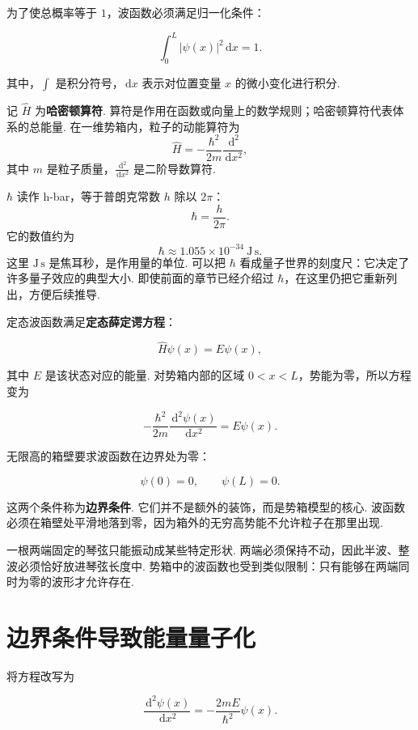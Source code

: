\documentclass[UTF8,11pt,a4paper,openany]{ctexbook}
\newcommand{\dd}{\,\mathrm d}\newcommand{\Ham}{\hat H}\newcommand{\tr}{\operatorname{Tr}}
\newcommand{\term}[1]{\textbf{#1}}
\begin{document}
为了使总概率等于 $1$，波函数必须满足归一化条件：

\[
\int_0^L |\psi(x)|^2\dd x=1.
\]

其中，$\int$ 是积分符号，$\dd x$ 表示对位置变量 $x$ 的微小变化进行积分. 

\begin{notationbox}
记 $\Ham$ 为\term{哈密顿算符}. 算符是作用在函数或向量上的数学规则；哈密顿算符代表体系的总能量. 在一维势箱内，粒子的动能算符为
\[
\Ham=-\frac{\hbar^2}{2m}\frac{\dd^2}{\dd x^2},
\]
其中 $m$ 是粒子质量，$\frac{\dd^2}{\dd x^2}$ 是二阶导数算符. 
\end{notationbox}

\begin{notationbox}
$\hbar$ 读作 h-bar，等于普朗克常数 $h$ 除以 $2\pi$：
\[
\hbar=\frac{h}{2\pi}.
\]
它的数值约为
\[
\hbar\approx1.055\times10^{-34}\ \mathrm{J\,s}.
\]
这里 $\mathrm{J\,s}$ 是焦耳秒，是作用量的单位. 可以把 $\hbar$ 看成量子世界的刻度尺：它决定了许多量子效应的典型大小. 即使前面的章节已经介绍过 $\hbar$，在这里仍把它重新列出，方便后续推导. 
\end{notationbox}

定态波函数满足\term{定态薛定谔方程}：

\[
\Ham\psi(x)=E\psi(x),
\]

其中 $E$ 是该状态对应的能量. 对势箱内部的区域 $0<x<L$，势能为零，所以方程变为

\[
-\frac{\hbar^2}{2m}\frac{\dd^2\psi(x)}{\dd x^2}=E\psi(x).
\]

无限高的箱壁要求波函数在边界处为零：

\[
\psi(0)=0,\qquad \psi(L)=0.
\]

这两个条件称为\term{边界条件}. 它们并不是额外的装饰，而是势箱模型的核心. 波函数必须在箱壁处平滑地落到零，因为箱外的无穷高势能不允许粒子在那里出现. 

\begin{analogybox}
一根两端固定的琴弦只能振动成某些特定形状. 两端必须保持不动，因此半波、整波必须恰好放进琴弦长度中. 势箱中的波函数也受到类似限制：只有能够在两端同时为零的波形才允许存在. 
\end{analogybox}

\section{边界条件导致能量量子化}

将方程改写为

\[
\frac{\dd^2\psi(x)}{\dd x^2}
=-\frac{2mE}{\hbar^2}\psi(x).
\]
\end{document}
